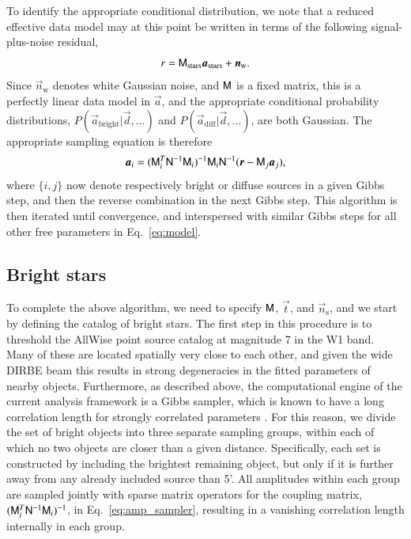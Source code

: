 \documentclass{aa}
\newcommand{\dv}[0]{\vec{d}}
\renewcommand{\t}[0]{\vec{t}}
\newcommand{\n}[0]{\vec{n}}
\renewcommand{\a}[0]{\vec{a}}
\newcommand{\N}[0]{\tens{N}}
\newcommand{\M}[0]{\tens{M}}
\renewcommand{\r}[0]{\vec{r}}
\begin{document}
To identify the appropriate conditional distribution, we note that a
reduced effective data model may at this point be written in terms of
the following signal-plus-noise residual,
\begin{equation}
  r = \M_{\mathrm{stars}}\a_{\mathrm{stars}} + \n_{\mathrm{w}}. 
\end{equation}
Since $\n_{\mathrm{w}}$ denotes white Gaussian noise, and $\M$ is a fixed matrix, this is a perfectly linear data model in $\a$, and the appropriate conditional probability distributions, $P(\a_{\mathrm{bright}}|\dv,\ldots)$ and $P(\a_{\mathrm{diff}}|\dv,\ldots)$, are both Gaussian. The appropriate sampling equation is therefore \citep[see, e.g., Appendix~1 in][]{bp01}
\begin{equation}
  \a_{i} = (\M_i^T \N^{-1} \M_i)^{-1} \M_i  \N^{-1}(\r-\M_j\a_j),
  \label{eq:amp_sampler}
\end{equation}
where $\{i,j\}$ now denote respectively bright or diffuse sources in a given Gibbs step, and then the reverse combination in the next Gibbs step. This algorithm is then iterated until convergence, and interspersed with similar Gibbs steps for all other free parameters in Eq.~\ref{eq:model}.


\subsection{Bright stars}
\label{sec:starmodel}

To complete the above algorithm, we need to specify $\M$, $\t$, and $\n_{\mathrm{s}}$, and we start by defining the catalog of bright stars. The first step in this procedure is to threshold the AllWise point source catalog \citep{wiseCat} at magnitude 7 in the W1 band. Many of these are located spatially very close to each other, and given the wide DIRBE beam this results in strong degeneracies in the fitted parameters of nearby objects. Furthermore, as described above, the computational engine of the current analysis framework is a Gibbs sampler, which is known to have a long correlation length for strongly correlated parameters \citep{geman:1984}. For this reason, we divide the set of bright objects into three separate sampling groups, within each of which no two objects are closer than a given distance. Specifically, each set is constructed by including the brightest remaining object, but only if it is further away from any already included source than 5'. All amplitudes within each group are sampled jointly with sparse matrix operators for the coupling matrix, $(\M_i^T \N^{-1} \M_i)^{-1}$, in Eq.~\ref{eq:amp_sampler}, resulting in a vanishing correlation length internally in each group.
\end{document}
